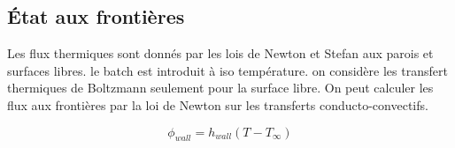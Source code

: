 \documentclass[12pt, a4paper, french, BCOR = 0pt, DIV = 10]{scrartcl}
\begin{document}
    \subsection{État aux frontières}
    
    Les flux thermiques sont donnés par les lois de Newton et Stefan aux parois et surfaces libres. le batch est introduit à iso température. on considère les transfert thermiques de Boltzmann seulement pour la surface libre.
    On peut calculer les flux aux frontières par la loi de Newton sur les transferts conducto-convectifs.\\ 
    \begin{center}
        $$
        \phi_{wall} = h_{wall} (T - T_{\infty})
        $$
    \end{center}
    
    
    
\end{document}
